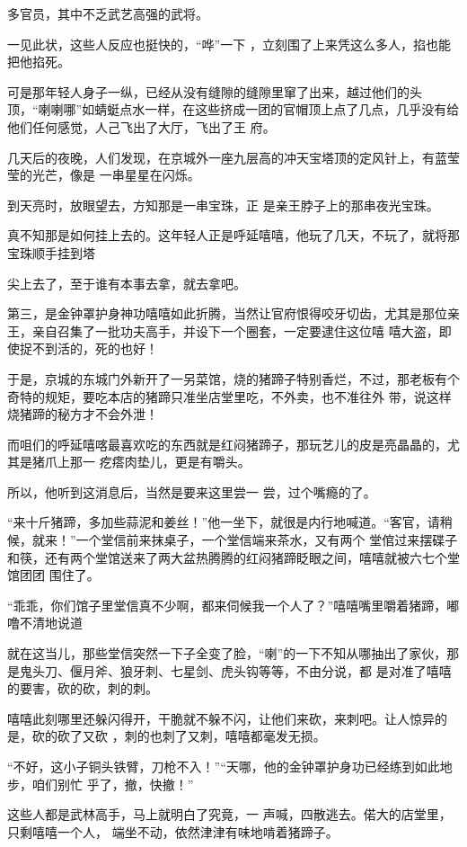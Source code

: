 \documentclass{article}
\begin{document}
多官员，其中不乏武艺高强的武将。 

一见此状，这些人反应也挺快的，“哗”一下
，立刻围了上来凭这么多人，掐也能把他掐死。 

可是那年轻人身子一纵，已经从没有缝隙的缝隙里窜了出来，越过他们的头顶，“喇喇哪”如蜻蜓点水一样，在这些挤成一团的官帽顶上点了几点，几乎没有给他们任何感觉，人己飞出了大厅，飞出了王
府。 

几天后的夜晚，人们发现，在京城外一座九层高的冲天宝塔顶的定风针上，有蓝莹莹的光芒，像是
一串星星在闪烁。 

到天亮时，放眼望去，方知那是一串宝珠，正
是亲王脖子上的那串夜光宝珠。 

真不知那是如何挂上去的。这年轻人正是呼延嘻嘻，他玩了几天，不玩了，就将那宝珠顺手挂到塔

\newpage
尖上去了，至于谁有本事去拿，就去拿吧。 

第三，是金钟罩护身神功嘻嘻如此折腾，当然让官府恨得咬牙切齿，尤其是那位亲王，亲自召集了一批功夫高手，并设下一个圈套，一定要逮住这位嘻
嘻大盗，即使捉不到活的，死的也好！ 

于是，京城的东城门外新开了一另菜馆，烧的猪蹄子特别香烂，不过，那老板有个奇特的规矩，要吃本店的猪蹄只准坐店堂里吃，不外卖，也不准往外
带，说这样烧猪蹄的秘方才不会外泄！ 

而咀们的呼延嘻喀最喜欢吃的东西就是红闷猪蹄子，那玩艺儿的皮是亮晶晶的，尤其是猪爪上那一
疙瘩肉垫儿，更是有嚼头。 

所以，他听到这消息后，当然是要来这里尝一
尝，过个嘴瘾的了。 

“来十斤猪蹄，多加些蒜泥和姜丝！”他一坐下，就很是内行地喊道。“客官，请稍候，就来！”一个堂信前来抹桌子，一个堂信端来茶水，又有两个
\newpage
堂倌过来摆碟子和筷，还有两个堂馆送来了两大盆热腾腾的红闷猪蹄眨眼之间，嘻嘻就被六七个堂馆团团
围住了。 

“乖乖，你们馆子里堂信真不少啊，都来伺候我一个人了？”嘻嘻嘴里嚼着猪蹄，嘟噜不清地说道

就在这当儿，那些堂信突然一下子全变了脸，“喇”的一下不知从哪抽出了家伙，那是鬼头刀、偃月斧、狼牙刺、七星剑、虎头钩等等，不由分说，都
是对准了嘻嘻的要害，砍的砍，刺的刺。 

嘻嘻此刻哪里还躲闪得开，干脆就不躲不闪，让他们来砍，来刺吧。让人惊异的是，砍的砍了又砍
，刺的也刺了又刺，嘻嘻都毫发无损。 

“不好，这小子铜头铁臂，刀枪不入！”“天哪，他的金钟罩护身功已经练到如此地步，咱们别忙
乎了，撤，快撤！” 

这些人都是武林高手，马上就明白了究竟，一
\newpage
声喊，四散逃去。偌大的店堂里，只剩嘻嘻一个人，
端坐不动，依然津津有味地啃着猪蹄子。 
\end{document}

